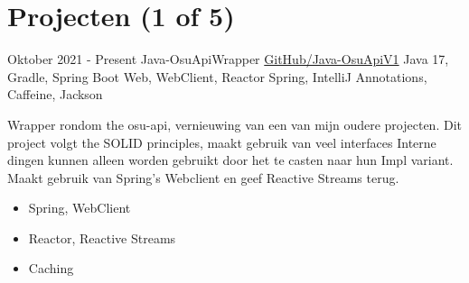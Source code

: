 \documentclass[letterpaper]{twentysecondcv} %
\begin{document}
\vspace{6mm}



\section{Projecten (1 of 5)}
\begin{twenty} %
	\twentyitem
    		{Oktober 2021 -}
		{Present}
        		{Java-OsuApiWrapper}
        		{\href{https://github.com/Tais993/Java-OsuApiV1/}{GitHub/Java-OsuApiV1}}
        		{Java 17, Gradle, Spring Boot Web, WebClient, Reactor Spring, IntelliJ Annotations, Caffeine, Jackson}
        		{
        		Wrapper rondom the osu-api, vernieuwing van een van mijn oudere projecten.
        		Dit project volgt the SOLID principles, maakt gebruik van veel interfaces
                Interne dingen kunnen alleen worden gebruikt door het te casten naar hun Impl variant.
                Maakt gebruik van Spring's Webclient en geef Reactive Streams terug.
        		\begin{itemize}
        		    \item Spring, WebClient
        		    \item Reactor, Reactive Streams
        		    \item Caching
                \end{itemize}}\\

\end{twenty}

\newpage

\makesidebarSecond %

\end{document}

